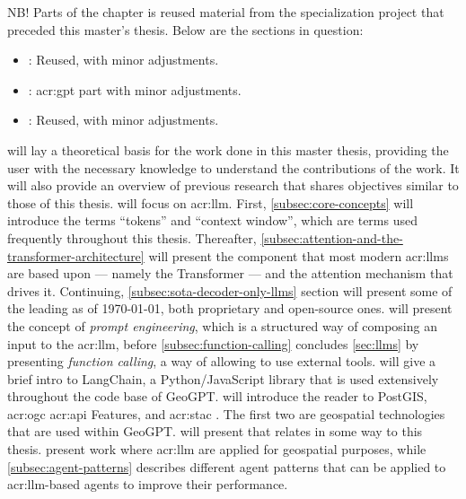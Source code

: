 \begin{itshape}
    NB! Parts of the  chapter is reused material from the specialization project \citep{holmLLMsDeathGIS2023} that preceded this master's thesis. Below are the sections in question:

    \begin{itemize}
        \item {}: Reused, with minor adjustments.
        \item {}: \acrshort{acr:gpt} part with minor adjustments.
        \item {}: Reused, with minor adjustments.
    \end{itemize}
\end{itshape}

\vspace{12pt}

\noindent {} will lay a theoretical basis for the work done in this master thesis, providing the user with the necessary knowledge to understand the contributions of the work. It will also provide an overview of previous research that shares objectives similar to those of this thesis.  will focus on \gls{acr:llm}. First, \autoref{subsec:core-concepts} will introduce the terms \enquote{tokens} and \enquote{context window}, which are terms used frequently throughout this thesis. Thereafter, \autoref{subsec:attention-and-the-transformer-architecture} will present the component that most modern \glspl{acr:llm} are based upon --- namely the Transformer --- and the attention mechanism that drives it. Continuing, \autoref{subsec:sota-decoder-only-llms} section will present some of the leading  as of \today, both proprietary and open-source ones.  will present the concept of \textit{prompt engineering}, which is a structured way of composing an input to the \acrshort{acr:llm}, before \autoref{subsec:function-calling} concludes \autoref{sec:llms} by presenting \textit{function calling}, a way of allowing  to use external tools.  will give a brief intro to LangChain, a Python/JavaScript library that is used extensively throughout the code base of GeoGPT.  will introduce the reader to PostGIS, \acrshort{acr:ogc} \acrshort{acr:api} Features, and \acrshort{acr:stac} . The first two are geospatial technologies that are used within GeoGPT.  will present that relates in some way to this thesis.  present work where \acrshort{acr:llm} are applied for geospatial purposes, while \autoref{subsec:agent-patterns} describes different agent patterns that can be applied to \acrshort{acr:llm}-based agents to improve their performance.


